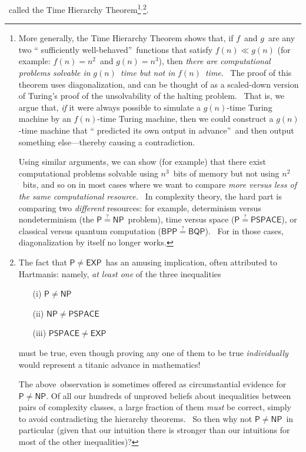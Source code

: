 \documentclass[12pt,onecolumn]{article}%
\begin{document}
\cite{hs}\ called the Time Hierarchy Theorem\footnote{More generally, the Time
Hierarchy Theorem shows that, if $f$\ and $g$\ are any two \textquotedblleft
sufficiently well-behaved\textquotedblright\ functions that satisfy $f\left(
n\right)  \ll g\left(  n\right)  $ (for example: $f\left(  n\right)  =n^{2}%
$\ and $g\left(  n\right)  =n^{3}$), then \textit{there are computational
problems solvable in }$g\left(  n\right)  $\textit{\ time but not in
}$f\left(  n\right)  $\textit{\ time}. \ The proof of this theorem uses
diagonalization, and can be thought of as a scaled-down version of Turing's
proof of the unsolvability of the halting problem. \ That is, we argue that,
\textit{if} it were always possible to simulate a $g\left(  n\right)  $-time
Turing machine by an $f\left(  n\right)  $-time Turing machine, then we could
construct a $g\left(  n\right)  $-time machine that \textquotedblleft
predicted its own output in advance\textquotedblright\ and then output
something else---thereby causing a contradiction.
\par
Using similar arguments, we can show (for example) that there exist
computational problems solvable using $n^{3}$\ bits of memory but not using
$n^{2}$\ bits, and so on in most cases where we want to compare \textit{more
versus less of the same computational resource.} \ In complexity theory, the
hard part is comparing two \textit{different} resources: for example,
determinism versus nondeterminism (the $\mathsf{P}\overset{?}{=}\mathsf{NP}%
$\ problem), time versus space ($\mathsf{P\overset{?}{=}PSPACE}$), or
classical versus quantum computation ($\mathsf{BPP\overset{?}{=}BQP}$). \ For
in those cases, diagonalization by itself no longer works.}$^{,}$\footnote{The
fact that $\mathsf{P}\neq\mathsf{EXP}$\ has an amusing implication, often
attributed to Hartmanis: namely, \textit{at least one} of the three
inequalities
\par
\begin{enumerate}
\item[(i)] $\mathsf{P}\neq\mathsf{NP}$
\par
\item[(ii)] $\mathsf{NP}\neq\mathsf{PSPACE}$
\par
\item[(iii)] $\mathsf{PSPACE}\neq\mathsf{EXP}$
\end{enumerate}
\par
\noindent must be true, even though proving any one of them to be true
\textit{individually} would represent a titanic advance in mathematics!
\par
The above\ observation is sometimes offered as circumstantial evidence for
$\mathsf{P}\neq\mathsf{NP}$. Of all our hundreds of unproved beliefs about
inequalities between pairs of complexity classes, a large fraction of them
\textit{must} be correct, simply to avoid contradicting the hierarchy
theorems. \ So then why not $\mathsf{P}\neq\mathsf{NP}$\ in particular (given
that our intuition there is stronger than our intuitions for most of the other
inequalities)?}.
\end{document}

